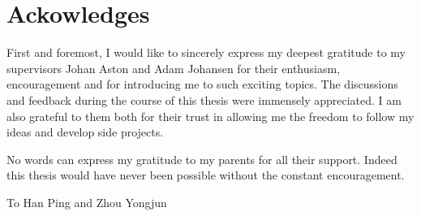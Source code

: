\chapter*{Ackowledges}

First and foremost, I would like to sincerely express my deepest gratitude to
my supervisors Johan Aston and Adam Johansen for their enthusiasm,
encouragement and for introducing me to such exciting topics. The discussions
and feedback during the course of this thesis were immensely appreciated. I am
also grateful to them both for their trust in allowing me the freedom to
follow my ideas and develop side projects.

No words can express my gratitude to my parents for all their support. Indeed
this thesis would have never been possible without the constant encouragement.

\baselineskip
\begin{center}
  \Large To Han Ping and Zhou Yongjun 
\end{center}
